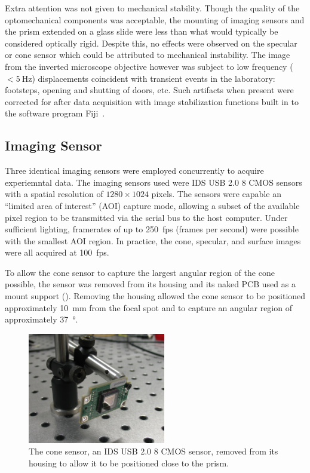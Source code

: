 Extra attention was not given to mechanical stability.  Though the quality
of the optomechanical components was acceptable, the mounting of imaging
sensors and the prism extended on a glass slide were less than what would
typically be considered optically rigid.  Despite this, no effects were
observed on the specular or cone sensor which could be attributed to
mechanical instability.  The image from the inverted microscope objective
however was subject to low frequency ($<\SI{5}{\hertz}$) displacements
coincident with transient events in the laboratory: footsteps, opening and
shutting of doors, etc.  Such artifacts when present were corrected for
after data acquisition with image stabilization functions built in to the
software program Fiji~\cite{schindelin2012fiji}.

\subsection{Imaging Sensor}

Three identical imaging sensors were employed concurrently to acquire
experiemntal data.  The imaging sensors used were IDS USB 2.0 \SI{8}{\bit}
CMOS sensors with a spatial resolution of $1280\times1024$ pixels.  The
sensors were capable an ``limited area of interest'' (AOI) capture mode,
allowing a subset of the available pixel region to be transmitted via the
serial bus to the host computer.  Under sufficient lighting, framerates of
up to \SI{250}{fps} (frames per second) were possible with the smallest AOI
region.  In practice, the cone, specular, and surface images were all
acquired at \SI{100}{fps}.

To allow the cone sensor to capture the largest angular region of the cone
possible, the sensor was removed from its housing and its naked PCB used as
a mount support ().  Removing the housing allowed
the cone sensor to be positioned approximately \SI{10}{\milli\meter} from
the focal spot and to capture an angular region of approximately
\SI{37}{\degree}.
\begin{figure}[ht]
 \centering
 \includegraphics[width=6cm,keepaspectratio]{experimental/figures/nakedsensorcrop.jpg}
\caption{The cone sensor, an IDS USB 2.0 \SI{8}{\bit} CMOS sensor, removed from its housing to allow it to be positioned close to the prism.}
\label{fig:imagingsensor}
\end{figure}


